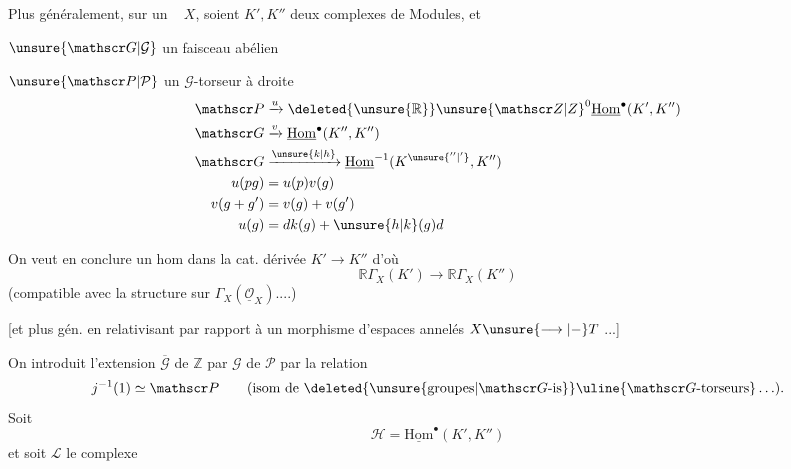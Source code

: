 Plus généralement, sur un \   $X$, soient $K',K''$ deux complexes de Modules, et

$\unsure{\mathscr G|\mathcal G}$ un faisceau abélien

$\unsure{\mathscr P|\mathcal P}$ un $\mathscr G$-torseur à droite
\[
 \begin{aligned}
 \mathscr P&\xrightarrow{u}\deleted{\unsure{\mathbb R}}\unsure{\mathscr Z|Z}^0\underline{\mathrm{Hom}}^\bullet(K',K'')\\
 \mathscr G&\xrightarrow{v}\underline{\mathrm{Hom}}^\bullet(K'',K'')\\
 \mathscr G&\xrightarrow{\unsure{k|h}}\underline{\mathrm{Hom}}^{-1}(K^{\unsure{''|'}},K'')\\
 u(pg)&=u(p)v(g)\\
 v(g+g')&=v(g)+v(g')\\
 u(g)&=dk(g)+\unsure{h|k}(g)d
 \end{aligned}
\]

On veut en conclure un hom dans la cat. dérivée $K'\longrightarrow K''$ d'où
\[
 \mathbb R\Gamma_X(K')\longrightarrow\mathbb R\Gamma_X(K'')
\]
(compatible avec la structure sur  $\Gamma_X(\underline{\mathcal O}_X)$....)

[et plus gén. en relativisant par rapport à un morphisme d'espaces annelés $X\unsure{\longrightarrow|-}T$ ...]

On introduit l'extension $\overline{\mathscr G}$ de $\mathbb Z$ par $\mathscr G$
  de $\mathscr P$ par la relation
\[
 j^{-1}(1)\simeq\mathscr P\qquad
 (\text{isom de }\deleted{\unsure{\text{groupes}|\mathscr G\text{-is}}}\uline{\mathscr G\text{-torseurs}}\ldots).
\]
Soit
\[
 \mathscr H=\underline{\mathrm{Hom}}^\bullet(K',K'')
\]
et soit $\mathcal L$ le complexe
